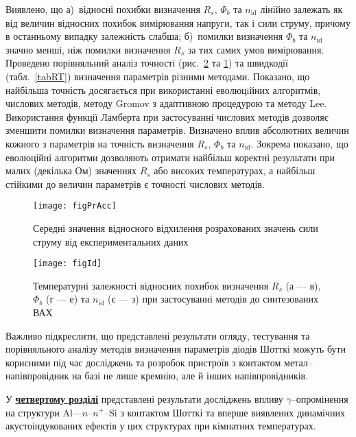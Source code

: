 Виявлено, що
а)~відносні похибки визначення $R_s$, $\Phi_b$ та $n_\mathrm{id}$ лінійно залежать як від величин відносних похибок вимірювання напруги, так і сили струму, причому в останньому випадку залежність слабша;
б)~помилки визначення $\Phi_b$ та $n_\mathrm{id}$ значно менші, ніж помилки визначення $R_s$ за тих самих умов вимірювання.
Проведено порівняльний аналіз точності (рис.~\ref{figId} та \ref{figPrAcc}) та швидкодії (табл.~\ref{tabRT}) визначення параметрів різними методами.
Показано, що найбільша точність досягається при використанні еволюцiйних алгоритмів, числових методів, методу Gromov з адаптивною процедурою та методу Lee.
Використання функції Ламберта при застосуванні числових методів дозволяє зменшити помилки визначення параметрів.
Визначено вплив абсолютних величин кожного з параметрів на точність визначення $R_s$, $\Phi_b$ та $n_\mathrm{id}$.
Зокрема показано, що еволюційні алгоритми дозволяють отримати найбільш коректні результати при малих (декілька Ом) значеннях $R_s$ або високих температурах, а найбільш стійкими до величин параметрів є точності числових методів.
\begin{figure}[ht]
\center
\texttt{[image: figPrAcc]}%
\caption{\label{figPrAcc}
Середні значення відносного відхилення розрахованих значень сили струму від експериментальних даних
}
\end{figure}

\begin{figure}
\center
\texttt{[image: figId]}%
\caption{\label{figId}
Температурні залежності відносних похибок визначення $R_s$ (а --- в), $\Phi_b$ (г --- е) та $n_\mathrm{id}$ (є --- з) при застосуванні методів до синтезованих ВАХ
}
\end{figure}




Важливо підкреслити, що представлені результати огляду, тестування та порівняльного аналізу методів визначення параметрів діодів Шотткі можуть бути корисними під час досліджень та розробок пристроїв з контактом метал--напівпровідник на базі не лише кремнію, але й інших напівпровідників.


У  \underline{\textbf{четвертому розділі}} представлені результати досліджень
впливу $\gamma$--опромінення на структури Al---$n$--$n^+$--Si з контактом Шотткі та
вперше виявлених динамічних акустоіндукованих ефектів у цих структурах при кімнатних температурах.

